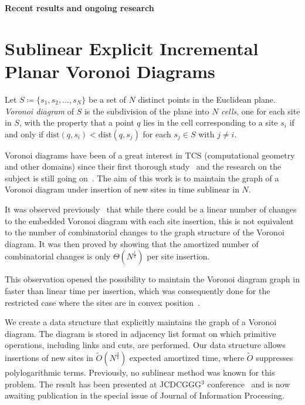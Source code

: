 \documentclass[a4paper,11pt]{article}
\def\vsection#1{\vspace{-4mm}\section{#1}\vspace{-3mm}}
\theoremstyle{definition}
\begin{document}
\def\P{\mathcal P} \def\Ot{\tilde O}

\begin{center}
	{\LARGE\bf Recent results and ongoing research}
\end{center} \vspace{-4.5mm}

\vsection{Sublinear Explicit Incremental Planar Voronoi Diagrams}

	Let $S \coloneqq \{s_1, s_2, \ldots, s_N\}$ be a set of $N$ distinct points in the Euclidean plane. \emph{Voronoi diagram} of $S$ is the subdivision of the plane into $N$ \emph{cells}, one for each site in $S$, with the property that a point $q$ lies in the cell corresponding to a site $s_i$ if and only if $\mathrm{dist} (q, s_i) < \mathrm{dist} (q, s_j)$ for each $s_j \in S$ with $j \ne i$.

Voronoi diagrams have been of a great interest in TCS (computational geometry and other domains) since their first thorough study~\cite{v-vd} and the research on the subject is still going on~\cite{vd-new}. The aim of this work is to maintain the graph of a Voronoi diagram under insertion of new sites in time sublinear in $N$.

It was observed previously~\cite{incremental-vd} that while there could be a linear number of changes to the embedded Voronoi diagram with each site insertion, this is not equivalent to the number of combinatorial changes to the graph structure of the Voronoi diagram.
It was then proved by showing that the amortized number of combinatorial changes is only $\Theta(N^{\frac 12})$ per site insertion.

This observation opened the possibility to maintain the Voronoi diagram graph in faster than linear time per insertion, which was consequently done for the restricted case where the sites are in convex position~\cite{incremental-vd}.

We create a data structure that explicitly maintains the graph of a Voronoi diagram. The diagram is stored in adjacency list format on which primitive operations, including links and cuts, are performed. Our data structure allows insertions of new sites in $\Ot (N^{\frac 34})$ expected amortized time, where $\Ot$ suppresses polylogarithmic terms. Previously, no sublinear method was known for this problem. The result has been presented at JCDCGGG$^3$ conference~\cite{sevd} and is now awaiting publication in the special issue of Journal of Information Processing.
\end{document}

